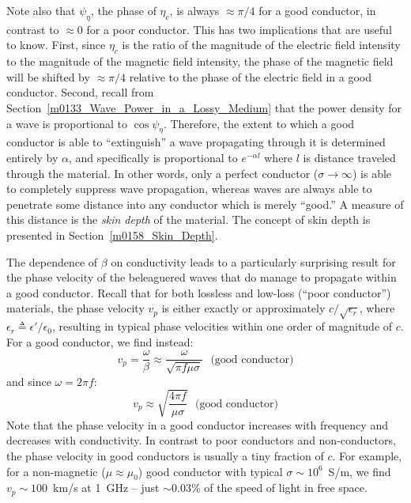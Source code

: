 Note also that $\psi_{\eta}$, the phase of $\eta_c$, is always $\approx\pi/4$ for a good conductor, in contrast to $\approx 0$ for a poor conductor.  This has two implications that are useful to know.  
First, since $\eta_c$ is the ratio of the magnitude of the electric field intensity to the magnitude of the magnetic field intensity, the phase of the magnetic field will be shifted by $\approx\pi/4$ relative to the phase of the electric field in a good conductor.
Second, recall from Section~\ref{m0133_Wave_Power_in_a_Lossy_Medium} that the power density for a wave is proportional to $\cos\psi_{\eta}$.
Therefore, the extent to which a good conductor is able to ``extinguish'' a wave propagating through it is determined entirely by $\alpha$, and specifically is proportional to $e^{-\alpha l}$ where $l$ is distance traveled through the material.
In other words, only a perfect conductor ($\sigma\to\infty$) is able to completely suppress wave propagation, whereas waves are always able to penetrate some distance into any conductor which is merely ``good.''
A measure of this distance is the \emph{skin depth} 
of the material.  The concept of skin depth is presented in Section~\ref{m0158_Skin_Depth}.

The dependence of $\beta$ on conductivity leads to a particularly surprising result for the phase velocity of the beleaguered waves that do manage to propagate within a good conductor.
Recall that for both lossless and low-loss (``poor conductor'') materials, the phase velocity $v_p$ is either exactly or approximately $c/\sqrt{\epsilon_r}$, where $\epsilon_r\triangleq \epsilon'/\epsilon_0$, resulting in typical phase velocities within one order of magnitude of $c$.  
For a good conductor, we find instead:
%
\begin{equation}
v_p = \frac{\omega}{\beta} \approx \frac{\omega}{\sqrt{\pi f\mu\sigma}}~~~\mbox{(good conductor)}
\end{equation}
%
and since $\omega=2\pi f$:
%
\begin{equation}
v_p \approx \sqrt{\frac{4\pi f}{\mu\sigma}} ~~~\mbox{(good conductor)}
\end{equation}
%
Note that the phase velocity in a good conductor increases with frequency and decreases with conductivity.
In contrast to poor conductors and non-conductors, the phase velocity in good conductors is usually a tiny fraction of $c$.
For example, for a non-magnetic ($\mu\approx\mu_0$) good conductor with typical $\sigma\sim 10^6$~S/m, we find 
$ v_p \sim 100$~km/s at 1~GHz -- just $\sim 0.03$\% of the speed of light in free space.

